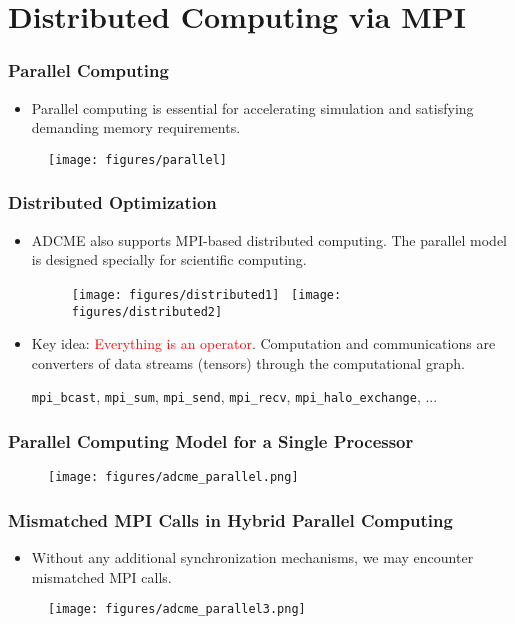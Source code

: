 \documentclass[usenames,dvipsnames]{beamer}
\begin{document}
\section{Distributed Computing via MPI}
\begin{frame}
	\frametitle{Parallel Computing}
	\begin{itemize}
		\item Parallel computing is essential for accelerating simulation and satisfying demanding memory requirements.
	\end{itemize}
	\begin{figure}[hbt]
		\texttt{[image: figures/parallel]}
	\end{figure}
\end{frame}


\begin{frame}
	\frametitle{Distributed Optimization}
	\begin{itemize}
		\item ADCME also supports MPI-based distributed computing. The parallel model is designed specially for scientific computing. 

	\begin{figure}[hbt]
		\centering
		\texttt{[image: figures/distributed1]}~
		\texttt{[image: figures/distributed2]}
	\end{figure}

\item Key idea: \textcolor{red}{Everything is an operator}. Computation and communications are converters of data streams (tensors) through the computational graph. 

\begin{center}
\texttt{mpi\_bcast}, \texttt{mpi\_sum}, \texttt{mpi\_send}, \texttt{mpi\_recv}, \texttt{mpi\_halo\_exchange}, ...
\end{center}

	\end{itemize}
\end{frame}

\begin{frame}
	\frametitle{Parallel Computing Model for a Single Processor}
	\begin{figure}[hbt]
		\texttt{[image: figures/adcme\_parallel.png]}
	\end{figure}
\end{frame}


\begin{frame}
	\frametitle{Mismatched MPI Calls in Hybrid Parallel Computing}
	\begin{itemize}
		\item Without any additional synchronization mechanisms, we may encounter mismatched MPI calls. 
	\end{itemize}
	\begin{figure}[hbt]
		\texttt{[image: figures/adcme\_parallel3.png]}
	\end{figure}
\end{frame}
\end{document}
